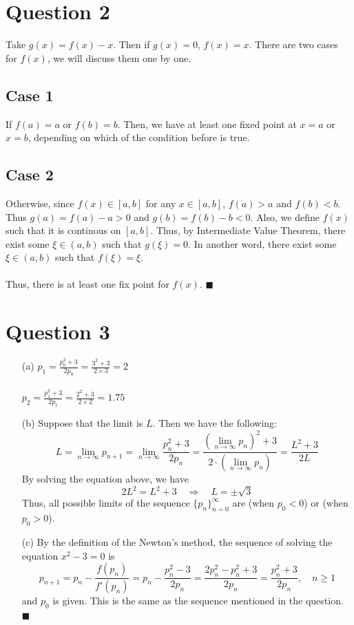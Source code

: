 \documentclass[11pt]{article}
\newcommand*{\boxtex}[1]{\framebox{#1}}
\begin{document}
\section*{Question 2}
Take $ g(x) = f(x)-x $. Then if $ g(x) = 0 $, $ f(x) = x $. There are two cases for $ f(x) $, we will discuss them one by one.
\subsection*{Case 1}
If $ f(a) = a$ or $ f(b) = b $. Then, we have at least one fixed point at $ x = a $ or $ x = b $, depending on which of the condition before is true.

\subsection*{Case 2}
Otherwise, since $ f(x) \in [a,b] $ for any $ x \in [a,b] $, $ f(a) > a $ and $ f(b) < b$. Thus $ g(a) = f(a) - a > 0  $ and $ g(b) = f(b) - b < 0 $. Also, we define $ f(x) $ such that it is continous on $ [a, b] $. Thus, by Intermediate Value Theorem, there exist some $ \xi \in  (a, b) $ such that $ g(\xi) = 0 $. In another word, there exist some $ \xi \in (a,b) $ such that $ f(\xi) =\xi $. \\\\
Thus, there is at least one fix point for $ f(x) $. \hfill$ \blacksquare $

\section*{Question 3}
\begin{itemize}
	\item [(a)]
	$ \displaystyle p_1 = \frac{p_0^2+3}{2p_0} = \frac{3^2+3}{2\times 3}= 2$\\\\
	$ \displaystyle p_2 = \frac{p_1^2+3}{2p_1} = \frac{2^2+3}{2\times 2}= 1.75$
	
	\item [(b)]
	Suppose that the limit is $ L $. Then we have the following:
	\[ L = \lim_{n \rightarrow \infty} p_{n+1} = \lim_{n \rightarrow \infty}\frac{p_n^2 + 3}{2 p_n} = \frac{(\lim_{n \rightarrow \infty} p_n)^2 + 3 }{2\cdot (\lim_{n \rightarrow \infty}p_n)} = \frac{L^2+3}{2L}\]
	By solving the equation above, we have
	\[ 2L^2 = L^2 + 3 \quad\Rightarrow\quad L = \pm \sqrt{3}  \]
	Thus, all possible limits of the sequence $ \{p_n\}_{n=0}^{\infty} $ are \boxtex{$ -\sqrt{3} $} (when $ p_0 < 0 $) or \boxtex{$ \sqrt{3} $} (when $ p_0 > 0 $).
	
	\item [(c)]
	By the definition of the Newton's method, the sequence of solving the equation $ x^2 -3 = 0 $ is 
	\[ p_{n+1} = p_n - \frac{f(p_n)}{f'(p_n)} = p_n - \frac{p_n^2 - 3}{2p_n}  = \frac{2p_n^2 - p_n^2 + 3}{2p_n} = \frac{p_n^2+3}{2p_n}, \quad n \ge 1\]
	and $ p_0 $ is given. This is the same as the sequence mentioned in the question. \hfill $ \blacksquare $
\end{itemize}
\end{document}
